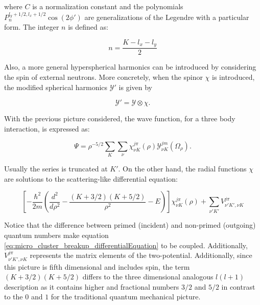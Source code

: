\documentclass[openany]{book}
\begin{document}
where $C$ is a normalization constant and the polynomials $P_n^{l_y + 1/2, l_x + 1/2} \cos (2\phi')$ are generalizations of the Legendre with a particular form. The integer $n$ is defined as: 

\begin{equation}\label{eq:micro_cluster_breakup_n}
	n = \frac{K - l_x - l_y}{2}
\end{equation}

Also, a more general hyperspherical harmonics can be introduced by considering the spin of external neutrons. More concretely, when the spinor $\chi$ is introduced, the modified spherical harmonics $\mathcal{Y}'$ is given by 

\begin{equation}\label{eq:micro_cluster_breakup_hyperspherical_spinor}
	\mathcal{Y}' = \mathcal{Y} \otimes \chi.
\end{equation}

With the previous picture considered, the wave function, for a three body interaction, is expressed as: 

\begin{equation}\label{eq:micro_cluster_breakup_wavefunction_complete}
	\Psi = {\rho}^{-5/2} \sum_{K} \sum_{\nu} {\chi^{j\pi}_{\nu K} (\rho) \mathcal{Y}^{jm}_{\nu K} (\Omega_{\rho})}.
\end{equation}

Usually the series is truncated at $K'$. On the other hand, the radial functions $\chi$ are solutions to the scattering-like differential equation: 

\begin{equation}\label{eq:micro_cluster_breakup_differentialEquation}
	\left[ -\frac{\hbar^2}{2m} \left( \frac{d^2}{d\rho^2} - \frac{(K + 3/2)(K + 5/2)}{\rho^2} - E \right)  \right ] \chi^{j\pi}_{\nu K} (\rho)   + \sum_{\nu' K'} V^{j\pi}_{\nu' K', \nu K}
\end{equation}

Notice that the difference between primed (incident) and non-primed (outgoing) quantum numbers make equation \ref{eq:micro_cluster_breakup_differentialEquation} to be coupled. Additionally, $V^{j\pi}_{\nu' K', \nu K}$ represents the matrix elements of the two-potential. Additionally, since this picture is fifth dimensional and includes spin, the term $(K + 3/2)(K + 5/2)$ differs to the three dimensional analogous $l(l +1)$ description as it contains higher and fractional numbers $3/2$ and $5/2$ in contrast to the $0$ and $1$ for the traditional quantum mechanical picture. \\
\end{document}
